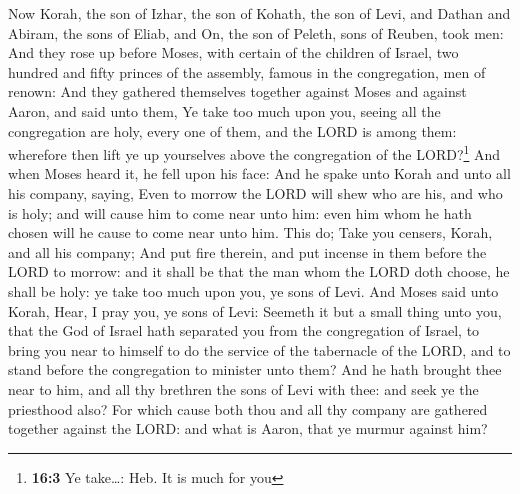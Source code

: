  Now Korah, the son of Izhar, the son of Kohath, the son
of Levi, and Dathan and Abiram, the sons of Eliab, and On, the son of
Peleth, sons of Reuben, took men:  And they rose up before
Moses, with certain of the children of Israel, two hundred and fifty
princes of the assembly, famous in the congregation, men of renown:
 And they gathered themselves together against Moses and
against Aaron, and said unto them, Ye take too much upon you, seeing all
the congregation are holy, every one of them, and the LORD is among
them: wherefore then lift ye up yourselves above the congregation of the
LORD?\footnote{\textbf{16:3} Ye take\ldots: Heb. It is much for you}
 And when Moses heard it, he fell upon his face:
 And he spake unto Korah and unto all his company, saying,
Even to morrow the LORD will shew who are his, and who is holy; and will
cause him to come near unto him: even him whom he hath chosen will he
cause to come near unto him.  This do; Take you censers,
Korah, and all his company;  And put fire therein, and put
incense in them before the LORD to morrow: and it shall be that the man
whom the LORD doth choose, he shall be holy: ye take too much upon you,
ye sons of Levi.  And Moses said unto Korah, Hear, I pray
you, ye sons of Levi:  Seemeth it but a small thing unto
you, that the God of Israel hath separated you from the congregation of
Israel, to bring you near to himself to do the service of the tabernacle
of the LORD, and to stand before the congregation to minister unto them?
 And he hath brought thee near to him, and all thy
brethren the sons of Levi with thee: and seek ye the priesthood also?
 For which cause both thou and all thy company are
gathered together against the LORD: and what is Aaron, that ye murmur
against him?

